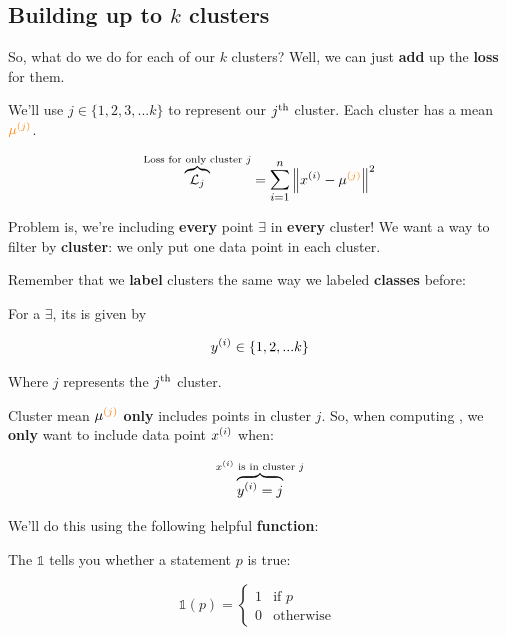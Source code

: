     \subsection{Building up to $k$ clusters}
    
        So, what do we do for each of our $k$ clusters? Well, we can just \textbf{add} up the \textbf{loss} for them.
        
        We'll use $j \in \{1, 2, 3, ... k\}$ to represent our $j^{ \text{th} }$ cluster. Each cluster has a mean $\textcolor{orange}{\mu^{(j)}}$.
  
        
        \begin{equation}
            \overbrace{\loss_j}^{\text{Loss for only cluster $j$}} = 
            \mathlarger{\sum_{i=1}^n} 
                \norm{ \ex{x}{i} - \mu^{\org{(j)}} }^2
        \end{equation}
        
        Problem is, we're including \textbf{every} point $\exi$ in \textbf{every} cluster! We want a way to filter by \textbf{cluster}: we only put one data point in each cluster.
        
        Remember that we \textbf{label} clusters the same way we labeled \textbf{classes} before:\\
        
        \begin{notation}
            For a  $\exi$, its  is given by
            
            \begin{equation*}
                y^{(i)} \in \{1, 2, ... k \}
            \end{equation*}
            
            Where $j$ represents the $j^{ \text{th} }$ cluster.
        \end{notation}
        
        Cluster mean $\mu^{\textcolor{orange}{(j)}}$ \textbf{only} includes points in cluster $j$. So, when computing , we \textbf{only} want to include data point $x^{(i)}$ when:
        
        \begin{equation}
            \overbrace{
            y^{(i)} = j}^{\text{$x^{(i)}$ is in cluster $j$}}
        \end{equation}
        
        We'll do this using the following helpful \textbf{function}:\\
        
        \begin{notation}
            The  $\mathbb{1}$ tells you whether a statement $p$ is true:
            
            \begin{equation*}
                \mathbb{1}(p) = 
                \begin{cases}
                    1 & \text{if $p$} \\
                    0 & \text{otherwise }
                \end{cases}
            \end{equation*}
        \end{notation}
        
